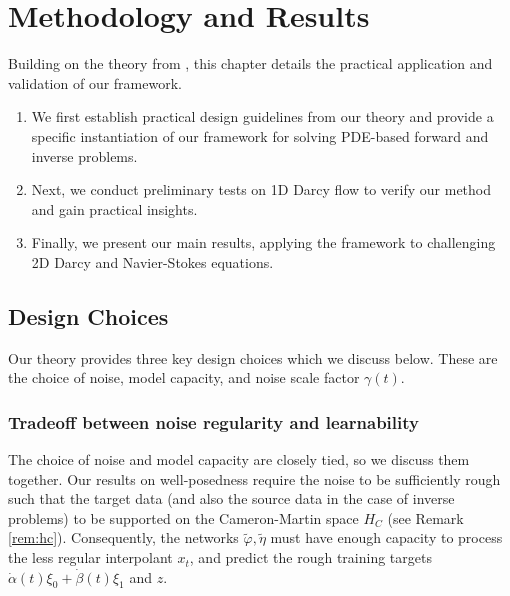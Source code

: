\chapter{Methodology and Results}\label{cha:4}

\ifpdf
\graphicspath{{Chapter4/Figs/Raster/}{Chapter4/Figs/PDF/}{Chapter4/Figs/}}
\else
\graphicspath{{Chapter4/Figs/Vector/}{Chapter4/Figs/}}
\fi

Building on the theory from , this chapter details the practical application and validation of our framework.
\begin{enumerate}
  \item We first establish practical design guidelines from our theory and provide a specific instantiation of our framework for solving PDE-based forward and inverse problems.
  \item Next, we conduct preliminary tests on 1D Darcy flow to verify our method and gain practical insights.
  \item Finally, we present our main results, applying the framework to challenging 2D Darcy and Navier-Stokes equations.
\end{enumerate}

\section{Design Choices} \label{sec:dp}
Our theory provides three key design choices which we discuss below. These are the choice of noise, model capacity, and noise scale factor \(\gamma(t)\).

\subsection{Tradeoff between noise regularity and learnability} \label{sec:design1}
The choice of noise and model capacity are closely tied, so we discuss them together.  Our results on well-posedness require the noise to be sufficiently rough such that the target data (and also the source data in the case of inverse problems) to be supported on the Cameron-Martin space \(H_{C}\) (see Remark \ref{rem:hc}). Consequently, the networks \(\widetilde{\varphi}, \widetilde{\eta}\) must have enough capacity to process the less regular interpolant \(x_{t}\), and predict the rough training targets \(\dot{\alpha}(t)\xi_{0} + \dot{\beta}(t) \xi_{1}\) and \(z\).

